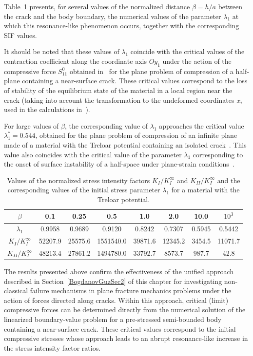 Table~\ref{BogdanovGuzTab1}
 presents, for several values of the normalized distance
$\beta=h/a$ between the crack and the body boundary, the numerical
values of the parameter $\lambda_{1}$ at which this resonance-like
phenomenon occurs, together with the corresponding SIF values.

It should be noted that these values of $\lambda_{1}$ coincide with the
critical values of the contraction coefficient along the coordinate
axis $Oy_{1}$ under the action of the compressive force $S_{11}^{0}$
obtained in~\cite{BogdanovGuz31} for the plane problem of compression of
a half-plane containing a near-surface crack. These critical values
correspond to the loss of stability of the equilibrium state of the
material in a local region near the crack (taking into account the
transformation to the undeformed coordinates $x_{i}$ used in the
calculations in~\cite{BogdanovGuz31}).

For large values of $\beta$, the corresponding value of $\lambda_{1}$
approaches the critical value $\lambda_{1}^{*}=0.544$, obtained for the
plane problem of compression of an infinite plane made of a material
with the Treloar potential containing an isolated crack~\cite{BogdanovGuz31}.
This value also coincides with the critical value of the parameter
$\lambda_{1}$ corresponding to the onset of surface instability of a
half-space under plane-strain conditions~\cite{BogdanovGuz27}.

\begin{table}[!h]
	\centering
	\caption{Values of the normalized stress intensity factors
		$K_{I}/K_{I}^{\infty}$ and $K_{II}/K_{I}^{\infty}$ and the corresponding
		values of the initial stress parameter $\lambda_{1}$ for a material with
		the Treloar potential.}
	\label{BogdanovGuzTab1}
	
	\begin{tabular*}{\textwidth}{@{\extracolsep{\fill}}cccccccc}
		\toprule
		$\beta$ & 0.1 & 0.25 & 0.5 & 1.0 & 2.0 & 10.0 & $10^{3}$ \\
		\midrule
		$\lambda_{1}$ & 0.9958 & 0.9689 & 0.9120 & 0.8242 & 0.7307 & 0.5945 & 0.5442 \\
		$K_{I}/K_{I}^{\infty}$ & 52207.9 & 25575.6 & 1551540.0 & 39871.6 & 12345.2 & 3454.5 & 11071.7 \\
		$K_{II}/K_{I}^{\infty}$ & 48213.4 & 27861.2 & 1494780.0 & 33792.7 & 8573.7 & 987.7 & 42.8 \\
		\bottomrule
	\end{tabular*}
	
\end{table}
The results presented above confirm the effectiveness of the unified
approach described in Section~\ref{BogdanovGuzSec2} of this chapter for investigating
non-classical failure mechanisms in plane fracture mechanics problems
under the action of forces directed along cracks. Within this approach,
critical (limit) compressive forces can be determined directly from the
numerical solution of the linearized boundary-value problem for a
pre-stressed semi-bounded body containing a near-surface crack.
These critical values correspond to the initial compressive stresses
whose approach leads to an abrupt resonance-like increase in the stress
intensity factor ratios.

